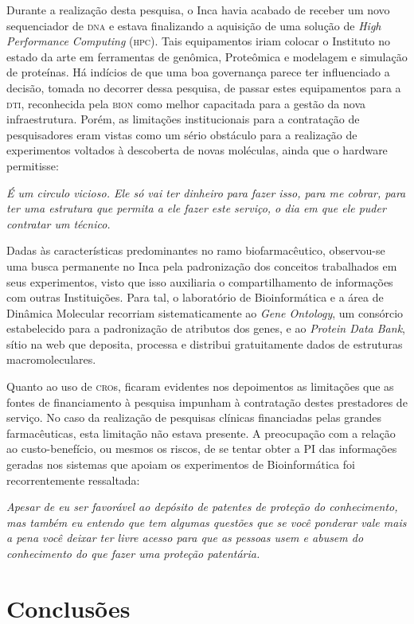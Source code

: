 \documentclass{article}
\begin{document}
Durante a realização desta pesquisa, o Inca havia acabado de receber um novo
sequenciador de \textsc{dna} e estava finalizando a aquisição de uma solução de
\textit{High Performance Computing}
(\textsc{hpc}). Tais equipamentos iriam colocar o Instituto no estado da arte em
ferramentas de genômica, Proteômica e modelagem e simulação de proteínas. Há
indícios de que uma boa governança parece ter influenciado a decisão, tomada no
decorrer dessa pesquisa, de passar estes equipamentos para a \textsc{dti}, reconhecida
pela \textsc{bion} como melhor capacitada para a gestão da nova infraestrutura. Porém, as
limitações institucionais para a contratação de pesquisadores eram vistas como
um sério obstáculo para a realização de experimentos voltados à descoberta de
novas moléculas, ainda que o hardware permitisse:

\textit{É um circulo vicioso. Ele só vai ter dinheiro para fazer isso, para me
cobrar, para ter uma estrutura que permita a ele fazer este serviço, o dia em
que ele puder contratar um técnico.}

Dadas às características predominantes no ramo biofarmacêutico, observou-se uma
busca permanente no Inca pela padronização dos conceitos trabalhados em seus
experimentos, visto que isso auxiliaria o compartilhamento de informações com
outras Instituições. Para tal, o laboratório de Bioinformática e a área de
Dinâmica Molecular recorriam sistematicamente ao \textit{Gene Ontology}, um consórcio estabelecido para a padronização de atributos dos genes, e ao
\textit{Protein Data Bank}, sítio na web que deposita, processa e distribui gratuitamente dados de
estruturas macromoleculares.

Quanto ao uso de \textsc{cro}s, ficaram evidentes nos depoimentos as limitações que as
fontes de financiamento à pesquisa impunham à contratação destes prestadores de
serviço. No caso da realização de pesquisas clínicas financiadas pelas grandes
farmacêuticas, esta limitação não estava presente. A preocupação com a relação
ao custo-benefício, ou mesmos os riscos, de se tentar obter a PI das informações
geradas nos sistemas que apoiam os experimentos de Bioinformática foi
recorrentemente ressaltada:

\textit{Apesar de eu ser favorável ao depósito de patentes de proteção do
conhecimento, mas também eu entendo que tem algumas questões que se você
ponderar vale mais a pena você deixar ter livre acesso para que as pessoas usem
e abusem do conhecimento do que fazer uma proteção patentária.}

\section{Conclusões}
\end{document}
